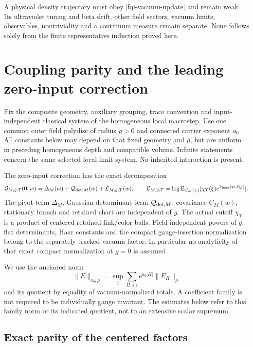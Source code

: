 \documentclass[11pt]{article}
\theoremstyle{remark}
\begin{document}
A physical density trajectory must obey
\eqref{fqi-vacuum-update} and remain weak. Its ultraviolet
tuning and beta drift, other field sectors, vacuum limits,
observables, nontriviality and a continuum measure remain
separate. None follows solely from the finite representative
induction proved here.


\section{Coupling parity and the leading zero-input correction}
\label{cgp-section}

Fix the composite geometry, auxiliary grouping, trace convention and
input-independent classical system of the homogeneous local macrostep.
Use one common outer field polydisc of radius $\rho>0$ and connected
carrier exponent $a_0$. All constants below may depend on that fixed
geometry and $\rho$, but are uniform in preceding homogeneous depth
and compatible volume. Infinite statements concern the same selected
local-limit system. No inherited interaction is present.

The zero-input correction has the exact decomposition
\begin{equation}
 \mathcal G_{M,g,T}(0;w)
   =\Delta_M(w)+\mathcal Q_{{\rm det},M}(w)
                         +\mathcal L_{M,g,T}(w),
 \qquad
 \mathcal L_{M,g,T}
  =\log\mathbb E_{C_M(w)}
          [\chi_T(\xi)e^{V_{\rm base}(w,\xi;g)}].
 \label{cgp-decomposition}
\end{equation}
The pivot term $\Delta_M$, Gaussian determinant term
$\mathcal Q_{{\rm det},M}$, covariance $C_M(w)$, stationary branch
and retained chart are independent of $g$. The actual cutoff
$\chi_T$ is a product of centered retained link/color balls.
Field-independent powers of $g$, flat determinants, Haar constants
and the compact gauge-insertion normalization belong to the
separately tracked vacuum factor. In particular no analyticity of
that exact compact normalization at $g=0$ is assumed.

We use the anchored norm
\[
 \|E\|_{a_0,\rho}
   =\sup_i\sum_{H\ni i}e^{a_0|H|}\|E_H\|_\rho
\]
and its quotient by equality of vacuum-normalized totals. A
coefficient family is not required to be individually gauge invariant.
The estimates below refer to this family norm or its indicated quotient,
not to an extensive scalar supremum.

\subsection{Exact parity of the centered factors}
\label{cgp-parity-section}
\end{document}
